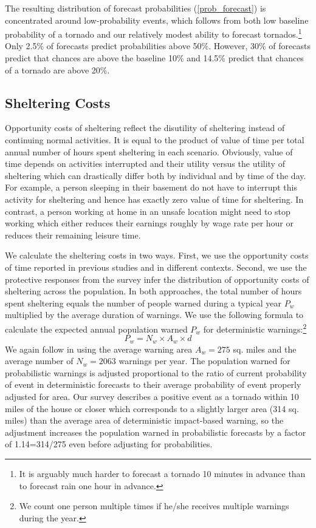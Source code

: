 \documentclass{ametsocV6.1}
\begin{document}
The resulting distribution of forecast probabilities (\ref{prob_forecast}) is concentrated around low-probability events, which follows from both low baseline probability of a tornado and our relatively modest ability to forecast tornados.\footnote{It is arguably much harder to forecast a tornado 10 minutes in advance than to forecast rain one hour in advance.} Only 2.5\% of forecasts predict probabilities above 50\%. However, 30\% of forecasts predict that chances are above the baseline 10\% and 14.5\% predict that chances of a tornado are above 20\%.


\vspace{10pt}
\subsection{Sheltering Costs}
Opportunity costs of sheltering reflect the disutility of sheltering instead of continuing normal activities. It is equal to the product of value of time per total annual number of hours  spent sheltering in each scenario. Obviously, value of time depends on activities interrupted and their utility versus the utility of sheltering which can drastically differ both by individual and by time of the day. For example, a person sleeping in their basement do not have to interrupt this activity for sheltering and hence has exactly zero value of time for sheltering. In contrast, a person working at home in an unsafe location might need to stop working which either reduces their earnings roughly by wage rate per hour or reduces their remaining leisure time.  

We calculate the sheltering costs in two ways. First, we use the opportunity costs of time reported in previous studies and in different contexts. Second, we use the protective responses from the survey infer the distribution of opportunity costs of sheltering across the population. In both approaches, the total number of hours spent sheltering equals the number of people warned during a typical year $P_w$ multiplied by the average duration of warnings. We use the following formula to calculate the expected annual population warned $P_w$ for deterministic warnings:\footnote{We count one person multiple times if he/she receives multiple warnings during the year.}
$$P_w= N_w \times A_w \times d $$
We again follow \citet{howard_firm_2021} in using the average warning area $A_w=275$ sq. miles and the average number of $N_w=2063$ warnings per year. The population warned for probabilistic warnings is adjusted proportional to the ratio of current probability of event in deterministic forecasts to their average probability of event properly adjusted for area. Our survey describes a positive event as a tornado within 10 miles of the house or closer which corresponds to a slightly larger area (314 sq. miles) than the average area of deterministic impact-based warning, so the adjustment increases the population warned in probabilistic forecasts by a factor of 1.14=314/275 even before adjusting for probabilities.
\end{document}
